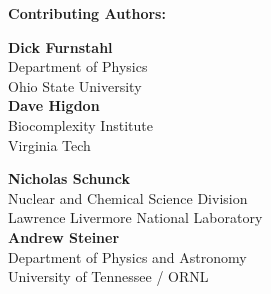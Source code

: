 {\bf \large Contributing Authors:}
\vspace{5mm}

\begin{minipage}[t]{0.5\linewidth}

\textbf{Dick Furnstahl}\\
Department of Physics\\ 
Ohio State University\\

\textbf{Dave Higdon}\\
Biocomplexity Institute\\
Virginia Tech


\end{minipage}
\hfill
\begin{minipage}[t]{0.5\linewidth}

{\bf Nicholas Schunck}\\
Nuclear and Chemical Science Division \\
Lawrence Livermore National Laboratory\\

{\bf Andrew Steiner}\\
Department of Physics and Astronomy\\
University of Tennessee / ORNL\\


\end{minipage}

